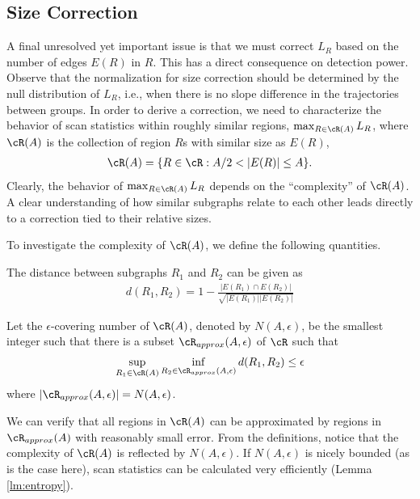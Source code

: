 \subsection{Size Correction}
A final unresolved yet important issue is that we must correct $L_R$ based on the number of edges $E(R)$ in $R$.
This has a direct consequence on detection power.
Observe that the normalization for size correction should be determined by the null distribution of $L_R$, i.e., 
when there is no slope difference in the trajectories between groups.
In order to derive a correction, we need to characterize the behavior of scan statistics within roughly similar regions, $\max_{R\in \cR(A)}L_R$, 
where $\cR(A)$ is the collection of region $R$s with similar size as $E(R)$,
\begin{align}
\cR(A)=\{R\in \cR:A/2<|E(R)|\le A\}.
\end{align}
Clearly, the behavior of $\max_{R\in \cR(A)}L_R$ depends on the ``complexity'' of $\cR(A)$. 
A clear understanding of how similar subgraphs relate to each other leads directly to a correction tied to their relative sizes.

To investigate the complexity of $\cR(A)$, we define the following quantities.
\begin{definition} The distance between subgraphs $R_1$ and $R_2$ can be given as
{\begin{align}
d(R_1,R_2)=1-\frac{|E(R_1)\cap E(R_2)|}{ \sqrt{|E(R_1)||E(R_2)|}}
\end{align}}
\end{definition}
\begin{definition}
Let the $\epsilon$-covering number of $\cR(A)$, denoted by $N(A,\epsilon)$, be the smallest integer such that there
is a subset $\cR_{approx}(A,\epsilon)$ of $\cR$ such that
{\begin{align}
\sup_{R_{1}\in\cR(A)}\inf_{R_{2}\in \cR_{approx}(A,\epsilon)}d(R_{1},R_{2})\le \epsilon
\end{align}}
where $|\cR_{approx}(A,\epsilon)|=N(A,\epsilon)$.
\end{definition}
We can verify that all regions in $\cR(A)$
can be approximated by regions in $\cR_{approx}(A)$ with reasonably small error.
From the definitions, notice that the complexity of $\cR(A)$ is reflected by $N(A,\epsilon)$.
If $N(A,\epsilon)$ is nicely bounded (as is the case here), scan statistics can be calculated very efficiently 
(Lemma \ref{lm:entropy}). 

